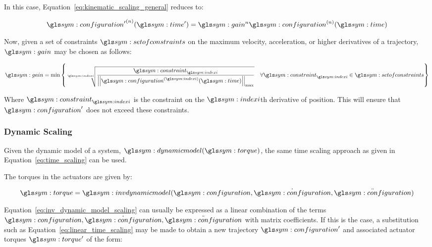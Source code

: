 			In this case, Equation~\ref{eq:kinematic_scaling_general} reduces
			to:

			\begin{equation}
				\tdern{\configuration'}{n}(\timesym') = \gain^{n}
					\tdern{\configuration}{n}(\timesym)
			\end{equation}

			Now, given a set of constraints $\setofconstraints$ on the maximum
			velocity, acceleration, or higher derivatives of a trajectory,
			$\gain$ may be chosen as follows:

			\begin{equation}
				\gain = \min
					\left\{
						\sqrt[\indexi]
						{%
							\frac
							{%
								\constraint_{\indexi}
							}
							{%
									\norm
									{%
										\tdern{\configuration}{\indexi}(\timesym)
									}_{\max}
							}
						}
						\quad
						\forall \constraint_{\indexi} \in \setofconstraints
					\right\}
			\end{equation}

			Where $\constraint_{\indexi}$ is the constraint on the $\indexi$th
			derivative of position. This will ensure that $\configuration'$ does
			not exceed these constraints.

		\subsubsection{Dynamic Scaling}%
		\label{sec:dynamic_scaling}

			Given the dynamic model of a system, $\dynamicmodel(\torque)$, the
			same time scaling approach as given in
			Equation~\ref{eq:time_scaling} can be used.

			The torques in the actuators are given by:

			\begin{equation}
				\torque = \invdynamicmodel(\configuration, \dot{\configuration},
					\ddot{\configuration})
				\label{eq:inv_dynamic_model_scaling}
			\end{equation}

			Equation~\ref{eq:inv_dynamic_model_scaling} can usually be expressed
			as a linear combination of the terms $\configuration,
			\dot{\configuration}, \ddot{\configuration}$ with matrix
			coefficients. If this is the case, a substitution such as
			Equation~\ref{eq:linear_time_scaling} may be made to obtain a new
			trajectory $\configuration'$ and associated actuator torques
			$\torque'$ of the form:

